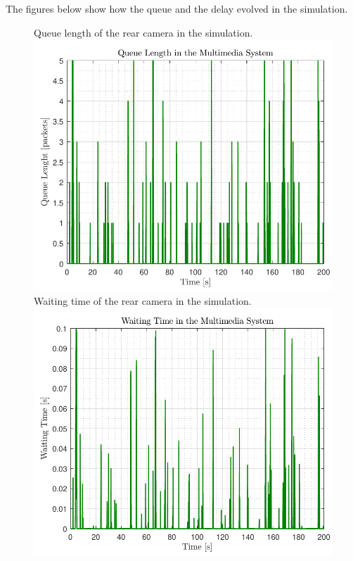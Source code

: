 The figures below show how the queue and the delay evolved in the simulation.
\begin{figure}[H]
	\captionbox
	{
		Queue length of the rear camera in the simulation.
		\label{fig:queueMultimedia}
	}
	{
		\includegraphics[width=.46\textwidth]{figures/queueMultimedia}
	}
	\hspace{5pt}
	\captionbox
	{
		Waiting time of the rear camera in the simulation.
		\label{fig:timeMultimedia}
	}
	{
		\includegraphics[width=.46\textwidth]{figures/timeMultimedia}
	}
\end{figure}
